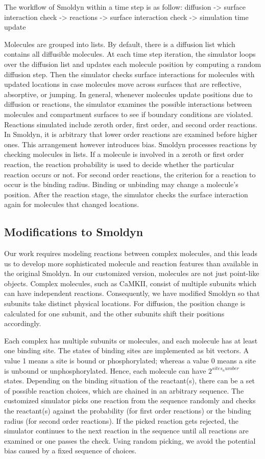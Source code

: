 The workflow of Smoldyn within a time step is as follow:
diffusion -> surface interaction check -> reactions -> surface interaction check -> simulation time update

Molecules are grouped into lists. By default, there is a diffusion list which contains all diffusible molecules. At each time step iteration, the simulator loops over the diffusion list and updates each molecule position by computing a random diffusion step. Then the simulator checks surface interactions for molecules with updated locations in case molecules move across surfaces that are reflective, absorptive, or jumping. In general, whenever molecules update positions due to diffusion or reactions, the simulator examines the possible interactions between molecules and compartment surfaces to see if boundary conditions are violated. Reactions simulated include zeroth order, first order, and second order reactions. In Smoldyn, it is arbitrary that lower order reactions are examined before higher ones. This arrangement however introduces bias. Smoldyn processes reactions by checking molecules in lists. If a molecule is involved in a zeroth or first order reaction, the reaction probability is used to decide whether the particular reaction occurs or not. For second order reactions, the criterion for a reaction to occur is the binding radius. Binding or unbinding may change a molecule’s position. After the reaction stage, the simulator checks the surface interaction again for molecules that changed locations.


\subsection{Modifications to Smoldyn}
Our work requires modeling reactions between complex molecules, and this leads us to develop more sophisticated molecule and reaction features than available in the original Smoldyn. In our customized version, molecules are not just point-like objects. Complex molecules, such as CaMKII, consist of multiple subunits which can have independent reactions. Consequently, we have modified Smoldyn so that subunits take distinct physical locations. For diffusion, the position change is calculated for one subunit, and the other subunits shift their positions accordingly.

Each complex has multiple subunits or molecules, and each molecule has at least one binding site. The states of binding sites are implemented as bit vectors. A value 1 means a site is bound or phosphorylated; whereas a value 0 means a site is unbound or unphosphorylated. Hence, each molecule can have $2^{sites_number}$ states. Depending on the binding situation of the reactant(s), there can be a set of possible reaction choices, which are chained in an arbitrary sequence. The customized simulator picks one reaction from the sequence randomly and checks the reactant(s) against the probability (for first order reactions) or the binding radius (for second order reactions). If the picked reaction gets rejected, the simulator continues to the next reaction in the sequence until all reactions are examined or one passes the check. Using random picking, we avoid the potential bias caused by a fixed sequence of choices.

